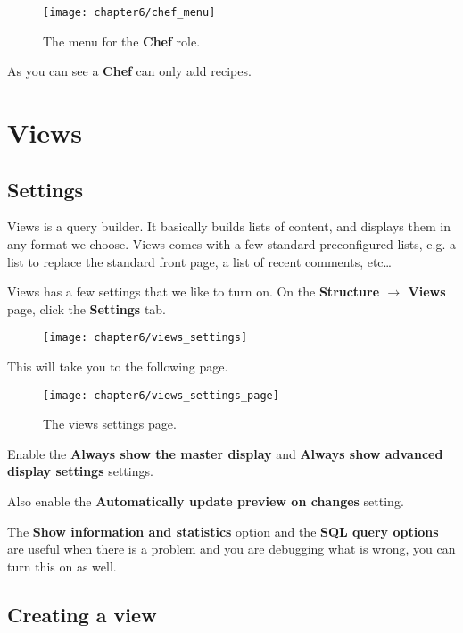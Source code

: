    \begin{figure}[H]
   	\centering
   	\texttt{[image: chapter6/chef\_menu]}
   	\caption{The menu for the \textbf{Chef} role.}
   	\label{fig:chef_menu}
   \end{figure}
   
   As you can see a \textbf{Chef} can only add recipes.
   
   \section{Views}
   
   \subsection{Settings}
   
   Views is a query builder. It basically builds lists of content, and displays them in any format
   we choose. Views comes with a few standard preconfigured lists, e.g. a list to replace the
   standard front page, a list of recent comments, etc\ldots
   
   Views has a few settings that we like to turn on. On the \textbf{Structure $\rightarrow$ Views} page, click the
   \textbf{Settings} tab.
   
   \begin{figure}[H]
   	\centering
   	\texttt{[image: chapter6/views\_settings]}
   	\label{fig:views_settings}
   \end{figure}
   
   This will take you to the following page.
   
   \begin{figure}[H]
   	\centering
   	\texttt{[image: chapter6/views\_settings\_page]}
   	\caption{The views settings page.}
   	\label{fig:views_settings_page}
   \end{figure}
   
   Enable the \textbf{Always show the master display} and \textbf{Always show advanced display settings} settings.
   
   Also enable the \textbf{Automatically update preview on changes} setting. 
   
   The \textbf{Show information and statistics} option and the \textbf{SQL query options} are useful when there
   is a problem and you are debugging what is wrong, you can turn this on as well.
   
   \subsection{Creating a view}
   

